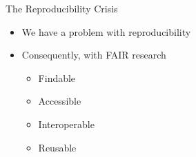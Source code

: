 \begin{frame}{The Reproducibility Crisis}
   \begin{itemize}
      \itemsep8pt
      \item<2-> We have a problem with reproducibility\supercite{baker20161}
      \item<3-> Consequently, with FAIR research\supercite{barker2022introducing} \begin{itemize}
         \item Findable %
         \item Accessible %
         \item Interoperable %
         \item Reusable %
      \end{itemize}
   \end{itemize}
\end{frame}
